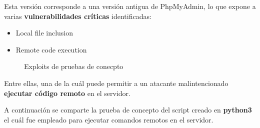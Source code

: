 \documentclass[a4paper]{article}
\begin{document}
\vspace{0.2cm}

Esta versión corresponde a una versión antigua de PhpMyAdmin, lo que expone a varias
\textbf{vulnerabilidades críticas} identificadas:
\begin{itemize}
  \item Local file inclusion
  \item Remote code execution
\end{itemize}

\begin{figure}[H]
  \begin{center}
    \setlength{\fboxrule}{0.8pt}
    \caption{Exploits de pruebas de conecpto}
    \label{fig: Identifiedsubdomains}
  \end{center}
\end{figure}

\vspace{0.2cm}

Entre ellas, una de la cuál puede permitir a un atacante malintencionado \textbf{ejecutar código remoto}
en el servidor.

\clearpage

A continuación se comparte la prueba de concepto del script creado en \textbf{python3}
el cuál fue empleado para ejecutar comandos remotos en el servidor.
\end{document}
